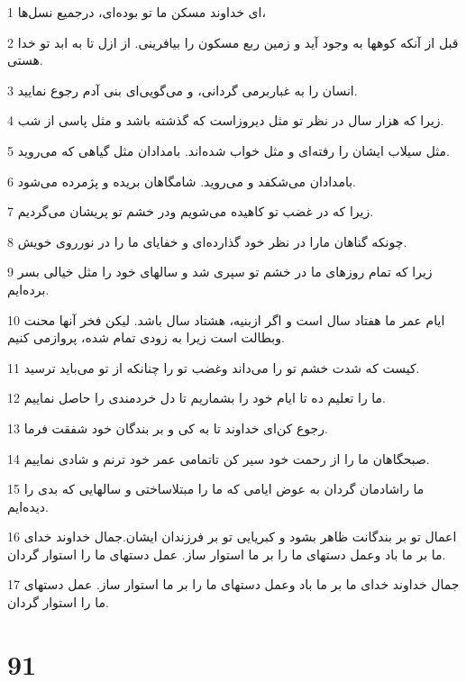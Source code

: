 \par 1 ای خداوند مسکن ما تو بوده‌ای، درجمیع نسل‌ها،
\par 2 قبل از آنکه کوهها به وجود آید و زمین ربع مسکون را بیافرینی. از ازل تا به ابد تو خدا هستی.
\par 3 انسان را به غباربرمی گردانی، و می‌گویی‌ای بنی آدم رجوع نمایید.
\par 4 زیرا که هزار سال در نظر تو مثل دیروزاست که گذشته باشد و مثل پاسی از شب.
\par 5 مثل سیلاب ایشان را رفته‌ای و مثل خواب شده‌اند. بامدادان مثل گیاهی که می‌روید.
\par 6 بامدادان می‌شکفد و می‌روید. شامگاهان بریده و پژمرده می‌شود.
\par 7 زیرا که در غضب تو کاهیده می‌شویم ودر خشم تو پریشان می‌گردیم.
\par 8 چونکه گناهان مارا در نظر خود گذارده‌ای و خفایای ما را در نورروی خویش.
\par 9 زیرا که تمام روزهای ما در خشم تو سپری شد و سالهای خود را مثل خیالی بسر برده‌ایم.
\par 10 ایام عمر ما هفتاد سال است و اگر ازبنیه، هشتاد سال باشد. لیکن فخر آنها محنت وبطالت است زیرا به زودی تمام شده، پروازمی کنیم.
\par 11 کیست که شدت خشم تو را می‌داند وغضب تو را چنانکه از تو می‌باید ترسید.
\par 12 ما را تعلیم ده تا ایام خود را بشماریم تا دل خردمندی را حاصل نماییم.
\par 13 رجوع کن‌ای خداوند تا به کی و بر بندگان خود شفقت فرما.
\par 14 صبحگاهان ما را از رحمت خود سیر کن تاتمامی عمر خود ترنم و شادی نماییم.
\par 15 ما راشادمان گردان به عوض ایامی که ما را مبتلاساختی و سالهایی که بدی را دیده‌ایم.
\par 16 اعمال تو بر بندگانت ظاهر بشود و کبریایی تو بر فرزندان ایشان.جمال خداوند خدای ما بر ما باد وعمل دستهای ما را بر ما استوار ساز. عمل دستهای ما را استوار گردان.
\par 17 جمال خداوند خدای ما بر ما باد وعمل دستهای ما را بر ما استوار ساز. عمل دستهای ما را استوار گردان.
 
\chapter{91}


